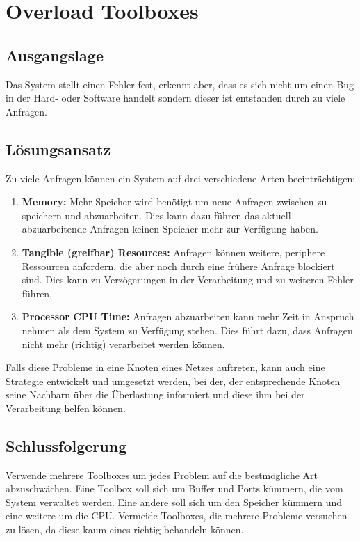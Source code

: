 \section{Overload Toolboxes}

\subsection{Ausgangslage}

Das System stellt einen Fehler fest, erkennt aber, dass es sich nicht um einen Bug in der Hard- oder Software handelt sondern dieser ist entstanden durch zu viele Anfragen.

\subsection{Lösungsansatz}

Zu viele Anfragen können ein System auf drei verschiedene Arten beeinträchtigen:
\begin{enumerate}
	\item \textbf{Memory:} Mehr Speicher wird benötigt um neue Anfragen zwischen zu speichern und abzuarbeiten. Dies kann dazu führen das aktuell abzuarbeitende Anfragen keinen Speicher mehr zur Verfügung haben.
	\item \textbf{Tangible (greifbar) Resources:} Anfragen können weitere, periphere Ressourcen anfordern, die aber noch durch eine frühere Anfrage blockiert sind. Dies kann zu Verzögerungen in der Verarbeitung und zu weiteren Fehler führen.
	\item \textbf{Processor CPU Time:} Anfragen abzuarbeiten kann mehr Zeit in Anspruch nehmen als dem System zu Verfügung stehen. Dies führt dazu, dass Anfragen nicht mehr (richtig) verarbeitet werden können.
\end{enumerate}

Falls diese Probleme in eine Knoten eines Netzes auftreten, kann auch eine Strategie entwickelt und umgesetzt werden, bei der, der entsprechende Knoten seine Nachbarn über die Überlastung informiert und diese ihm bei der Verarbeitung helfen können.

\subsection{Schlussfolgerung}

Verwende mehrere Toolboxes um jedes Problem auf die bestmögliche Art abzuschwächen. Eine Toolbox soll sich um Buffer und Ports kümmern, die vom System verwaltet werden. Eine andere soll sich um den Speicher kümmern und eine weitere um die CPU. Vermeide Toolboxes, die mehrere Probleme versuchen zu lösen, da diese kaum eines richtig behandeln können.

